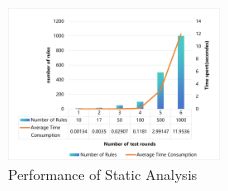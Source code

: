 %	

\begin{figure}[htbp]
	\caption{Performance of Static Analysis}
	\label{performance_static_analysis}
	\includegraphics[width=0.5\textwidth]{figure/performance.png}
	
\end{figure}

